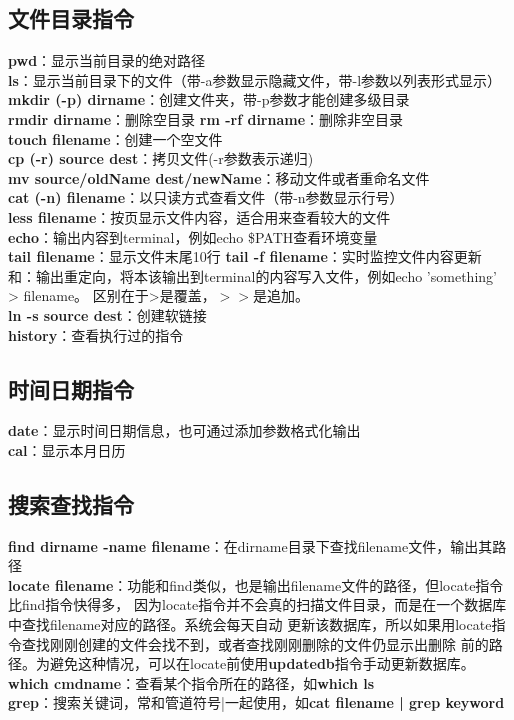 \documentclass[11pt]{article}
\begin{document}
\subsection{文件目录指令}

\textbf{pwd}：显示当前目录的绝对路径 \\
\textbf{ls}：显示当前目录下的文件（带-a参数显示隐藏文件，带-l参数以列表形式显示） \\
\textbf{mkdir (-p) dirname}：创建文件夹，带-p参数才能创建多级目录  \\
\textbf{rmdir dirname}：删除空目录 \qquad \textbf{rm -rf dirname}：删除非空目录  \\
\textbf{touch filename}：创建一个空文件 \\
\textbf{cp (-r) source dest}：拷贝文件(-r参数表示递归)  \\
\textbf{mv source/oldName dest/newName}：移动文件或者重命名文件  \\
\textbf{cat (-n) filename}：以只读方式查看文件（带-n参数显示行号）  \\
\textbf{less filename}：按页显示文件内容，适合用来查看较大的文件  \\
\textbf{echo}：输出内容到terminal，例如echo \$PATH查看环境变量 \\
\textbf{tail filename}：显示文件末尾10行 \qquad \textbf{tail -f filename}：实时监控文件内容更新 \\
\bm{$>$}和\bm{$>>$}：输出重定向，将本该输出到terminal的内容写入文件，例如echo 'something' > filename。
区别在于>是覆盖，$>>$是追加。  \\
\textbf{ln -s source dest}：创建软链接  \\
\textbf{history}：查看执行过的指令

\subsection{时间日期指令}
\textbf{date}：显示时间日期信息，也可通过添加参数格式化输出  \\
\textbf{cal}：显示本月日历

\subsection{搜索查找指令}
\textbf{find dirname -name filename}：在dirname目录下查找filename文件，输出其路径 \\
\textbf{locate filename}：功能和find类似，也是输出filename文件的路径，但locate指令比find指令快得多，
因为locate指令并不会真的扫描文件目录，而是在一个数据库中查找filename对应的路径。系统会每天自动
更新该数据库，所以如果用locate指令查找刚刚创建的文件会找不到，或者查找刚刚删除的文件仍显示出删除
前的路径。为避免这种情况，可以在locate前使用\textbf{updatedb}指令手动更新数据库。  \\
\textbf{which cmdname}：查看某个指令所在的路径，如\textbf{which ls}  \\
\textbf{grep}：搜索关键词，常和管道符号|一起使用，如\textbf{cat filename | grep keyword}
\end{document}
